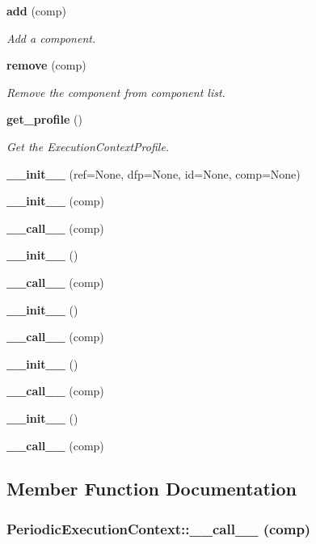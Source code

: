 \begin{CompactItemize}
{\bf add} (comp)
\begin{CompactList}\small\item\em Add a component. \item\end{CompactList}\item 
{\bf remove} (comp)
\begin{CompactList}\small\item\em Remove the component from component list. \item\end{CompactList}\item 
{\bf get\_\-profile} ()
\begin{CompactList}\small\item\em Get the Execution\-Context\-Profile. \item\end{CompactList}\item 
{\bf \_\-\_\-init\_\-\_\-} (ref=None, dfp=None, id=None, comp=None)
\item 
{\bf \_\-\_\-init\_\-\_\-} (comp)
\item 
{\bf \_\-\_\-call\_\-\_\-} (comp)
\item 
{\bf \_\-\_\-init\_\-\_\-} ()
\item 
{\bf \_\-\_\-call\_\-\_\-} (comp)
\item 
{\bf \_\-\_\-init\_\-\_\-} ()
\item 
{\bf \_\-\_\-call\_\-\_\-} (comp)
\item 
{\bf \_\-\_\-init\_\-\_\-} ()
\item 
{\bf \_\-\_\-call\_\-\_\-} (comp)
\item 
{\bf \_\-\_\-init\_\-\_\-} ()
\item 
{\bf \_\-\_\-call\_\-\_\-} (comp)
\end{CompactItemize}


\subsection{Member Function Documentation}
\subsubsection{\setlength{\rightskip}{0pt plus 5cm}Periodic\-Execution\-Context::\_\-\_\-call\_\-\_\- (comp)}\label{classPeriodicExecutionContext_PeriodicExecutionContexta42}


